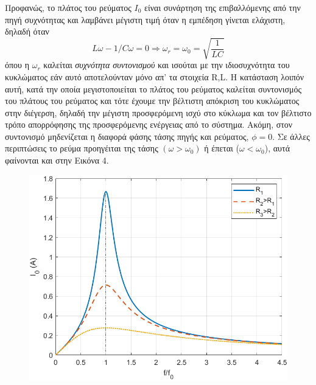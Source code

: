 \documentclass[a4paper]{article}
\begin{document}
Προφανώς, το πλάτος του ρεύματος $I_0$ είναι συνάρτηση της επιβαλλόμενης από την πηγή συχνότητας και λαμβάνει μέγιστη τιμή όταν η εμπέδηση γίνεται ελάχιστη, δηλαδή όταν
\begin{equation}\label{11}
L\omega-1/C\omega=0 \Rightarrow \omega_r=\omega_0 = \sqrt{\frac{1}{LC}}
\end{equation}
όπου η $\omega_r$ καλείται \textit{συχνότητα συντονισμού} και ισούται με την ιδιοσυχνότητα του κυκλώματος εάν αυτό αποτελούνταν μόνο απ' τα στοιχεία R,L.
 Η κατάσταση λοιπόν αυτή, κατά την οποία μεγιστοποιείται το πλάτος του ρεύματος καλείται συντονισμός του πλάτους του ρεύματος και τότε έχουμε την βέλτιστη απόκριση του κυκλώματος στην διέγερση, δηλαδή την μέγιστη προσφερόμενη ισχύ στο κύκλωμα και τον βέλτιστο τρόπο απορρόφησης της προσφερόμενης ενέργειας από το σύστημα.
  Ακόμη, στον συντονισμό μηδενίζεται η διαφορά φάσης τάσης πηγής και ρεύματος, $\phi =0$. Σε άλλες περιπτώσεις το ρεύμα προηγέιται της τάσης $(\omega>\omega_0)$ ή έπεται ($\omega<\omega_0$), αυτά φαίνονται και στην Εικόνα 4.
\begin{figure}
\centering
\caption{}
\includegraphics[scale=0.4]{rescurves.png}
\end{figure}
\end{document}
